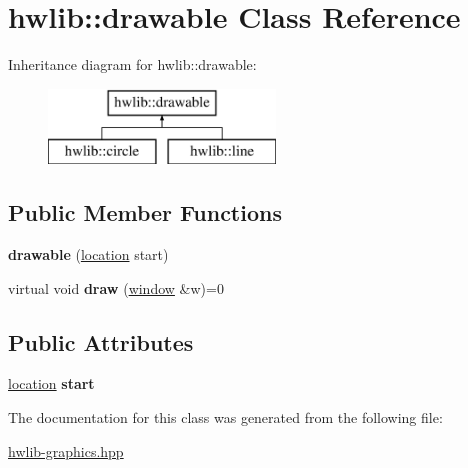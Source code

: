 \hypertarget{classhwlib_1_1drawable}{}\section{hwlib\+:\+:drawable Class Reference}
\label{classhwlib_1_1drawable}
Inheritance diagram for hwlib\+:\+:drawable\+:\begin{figure}[H]
\begin{center}
\leavevmode
\includegraphics[height=2.000000cm]{classhwlib_1_1drawable}
\end{center}
\end{figure}
\subsection*{Public Member Functions}
\begin{DoxyCompactItemize}
\item 
{\bfseries drawable} (\hyperlink{classhwlib_1_1location}{location} start)\hypertarget{classhwlib_1_1drawable_a48f84ea64249fe67f726e9631d149d66}{}\label{classhwlib_1_1drawable_a48f84ea64249fe67f726e9631d149d66}

\item 
virtual void {\bfseries draw} (\hyperlink{classhwlib_1_1window}{window} \&w)=0\hypertarget{classhwlib_1_1drawable_ac9ea0de52a14d9024cb34110f794ac28}{}\label{classhwlib_1_1drawable_ac9ea0de52a14d9024cb34110f794ac28}

\end{DoxyCompactItemize}
\subsection*{Public Attributes}
\begin{DoxyCompactItemize}
\item 
\hyperlink{classhwlib_1_1location}{location} {\bfseries start}\hypertarget{classhwlib_1_1drawable_a6c31bc9303840a4317d3c95250c357ce}{}\label{classhwlib_1_1drawable_a6c31bc9303840a4317d3c95250c357ce}

\end{DoxyCompactItemize}


The documentation for this class was generated from the following file\+:\begin{DoxyCompactItemize}
\item 
\hyperlink{hwlib-graphics_8hpp}{hwlib-\/graphics.\+hpp}\end{DoxyCompactItemize}
